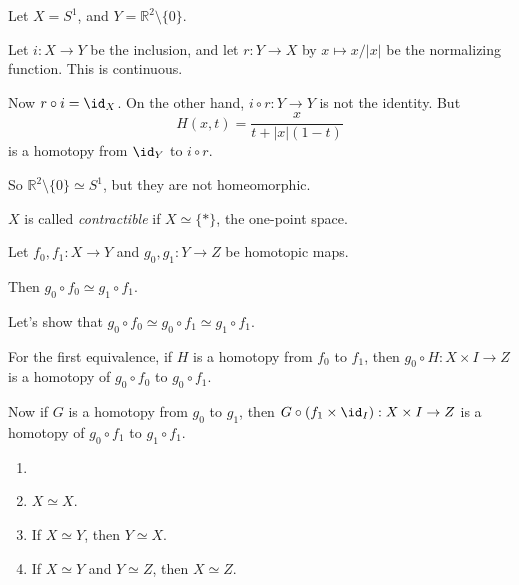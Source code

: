 \documentclass[12pt]{article}
\begin{document}
\begin{exbox}
	Let $X = S^1$, and $Y = \mathbb{R}^2 \setminus \{0\}$.

	Let $i : X \to Y$ be the inclusion, and let $r : Y \to X$ by $x \mapsto x/|x|$ be the normalizing function. This is continuous.

	Now $r \circ i = \id_X$. On the other hand, $i \circ r : Y \to Y$ is not the identity. But
	\[
	H(x, t) = \frac{x}{t + |x|(1-t)}
	\]
	is a homotopy from $\id_Y$ to $i \circ r$.

	So $\mathbb{R}^2 \setminus \{0\} \simeq S^1$, but they are not homeomorphic.
\end{exbox}

\begin{definition}
	$X$ is called \emph{contractible} if $X \simeq \{\ast\}$, the one-point space.
\end{definition}

\begin{lemma}
	Let $f_0, f_1 : X \to Y$ and $g_0, g_1 : Y \to Z$ be homotopic maps.

	Then $g_0 \circ f_0 \simeq g_1 \circ f_1$.
\end{lemma}

\begin{proofbox}
	Let's show that $g_0 \circ f_0 \simeq g_0 \circ f_1 \simeq g_1 \circ f_1$.

	For the first equivalence, if $H$ is a homotopy from $f_0$ to $f_1$, then $g_0 \circ H : X \times I \to Z$ is a homotopy of $g_0 \circ f_0$ to $g_0 \circ f_1$.

	Now if $G$ is a homotopy from $g_0$ to $g_1$, then $G \circ (f_1 \times \id_I) : X \times I \to Z$ is a homotopy of $g_0 \circ f_1$ to $g_1 \circ f_1$.
\end{proofbox}


\begin{proposition}
	\begin{enumerate}[\normalfont(i)]
		\item[]
		\item $X \simeq X$.
		\item If $X \simeq Y$, then $Y \simeq X$.
		\item If $X \simeq Y$ and $Y \simeq Z$, then $X \simeq Z$.
	\end{enumerate}	
\end{proposition}
\end{document}
